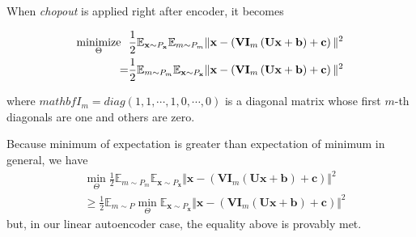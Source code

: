 \documentclass{article}
\newcommand{\minimize}{\mathop{\rm minimize}\limits}
\begin{document}
    When \textit{chopout} is applied right after encoder, it becomes
    
    \begin{align}
        \minimize_{\Theta} \ \ 
         &\frac{1}{2} \mathbb{E}_{\mathbf{x} \sim P_\mathbf{x}} \mathbb{E}_{m \sim P_m} \Vert \mathbf{x} - \left( \mathbf{V} \mathbf{I}_m \left( \mathbf{U} \mathbf{x} + \mathbf{b} \right) + \mathbf{c} \right) \Vert^2 \nonumber \\
         =& \frac{1}{2} \mathbb{E}_{m \sim P_m} \mathbb{E}_{\mathbf{x} \sim P_\mathbf{x}} \Vert \mathbf{x} - \left( \mathbf{V} \mathbf{I}_m \left( \mathbf{U} \mathbf{x} + \mathbf{b} \right) + \mathbf{c} \right) \Vert^2
    \end{align}    
    
    where $mathbf{I}_m = diag(1, 1, \cdots, 1, 0, \cdots, 0)$ is a diagonal matrix whose first $m$-th diagonals are one and others are zero. 

    Because minimum of expectation is greater than expectation of minimum in general, we have
    \begin{align}
    &\min_{\Theta} \frac{1}{2} \mathbb{E}_{m \sim P_m} \mathbb{E}_{\mathbf{x} \sim P_\mathbf{x}} \Vert \mathbf{x} - \left( \mathbf{V} \mathbf{I}_m \left( \mathbf{U} \mathbf{x} + \mathbf{b} \right) + \mathbf{c} \right) \Vert^2 \nonumber \\
    &\geq  \frac{1}{2} \mathbb{E}_{m \sim P} \min_{\Theta}  \mathbb{E}_{\mathbf{x} \sim P_\mathbf{x}} \Vert \mathbf{x} - \left( \mathbf{V} \mathbf{I}_m \left( \mathbf{U} \mathbf{x} + \mathbf{b} \right) + \mathbf{c} \right) \Vert^2
    \label{ineq:min_E_vs_E_min}
    \end{align} 
    but, in our linear autoencoder case, the equality above is provably met.
    
\end{document}
